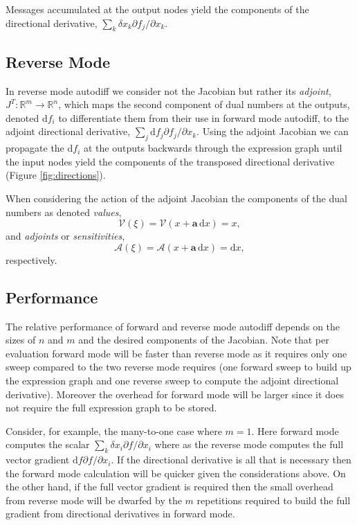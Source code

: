 Messages accumulated at the output nodes yield the components of the directional
derivative, $\sum_{k} \delta x_{k} \partial f_{j} / \partial x_{k}$.

\subsection*{Reverse Mode}

In reverse mode autodiff we consider not the Jacobian but rather its \textit{adjoint},
$J^{T} : \mathbb{R}^{m} \rightarrow \mathbb{R}^{n}$, which maps the second
component of dual numbers at the outputs, denoted $\mathrm{d} f_{i}$ to differentiate
them from their use in forward mode autodiff, to the adjoint directional derivative, 
$\sum_{j} \mathrm{d} f_{j} \partial f_{j} / \partial x_{k}$.  Using the adjoint Jacobian
we can propagate the $\mathrm{d} f_{i}$ at the outputs backwards through the 
expression graph until the input nodes yield the components of the transposed
directional derivative (Figure \ref{fig:directions}).

When considering the action of the adjoint Jacobian the components of the dual
numbers as denoted \textit{values},
%
\begin{equation*}
\mathcal{V} \! \left( \xi \right) 
= \mathcal{V} \! \left( x + \mathbf{a} \, \mathrm{d} x \right) 
= x,
\end{equation*}
%
and \textit{adjoints} or \textit{sensitivities},
\begin{equation*}
\mathcal{A} \! \left( \xi \right) 
= \mathcal{A} \! \left( x + \mathbf{a} \, \mathrm{d} x \right) 
= \mathrm{d} x,
\end{equation*}
%
respectively.

\subsection*{Performance}

The relative performance of forward and reverse mode autodiff depends on
the sizes of $n$ and $m$ and the desired components of the Jacobian.  Note
that per evaluation forward mode will be faster than reverse mode as it requires
only one sweep compared to the two reverse mode requires (one forward sweep
to build up the expression graph and one reverse sweep to compute the adjoint
directional derivative).  Moreover the overhead for forward mode will be larger
since it does not require the full expression graph to be stored.

Consider, for example, the many-to-one case where $m = 1$.  Here forward
mode computes the scalar $\sum_{k} \delta x_{i} \partial f / \partial x_{i}$
where as the reverse mode computes the full vector gradient 
$\mathrm{d} f \partial f / \partial x_{i}$.  If the directional derivative is all
that is necessary then the forward mode calculation will be quicker given
the considerations above.  On the other hand, if the full vector gradient is required 
then the small overhead from reverse mode will be dwarfed by the $m$ repetitions 
required to build the full gradient from directional derivatives in forward mode.

